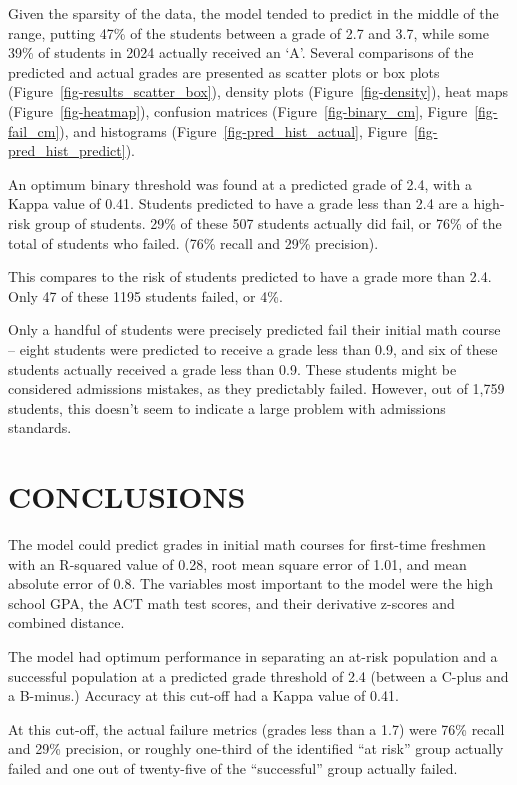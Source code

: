 \documentclass[
  letterpaper,
  DIV=11,
  numbers=noendperiod]{scrartcl}
\begin{document}
Given the sparsity of the data, the model tended to predict in the
middle of the range, putting 47\% of the students between a grade of 2.7
and 3.7, while some 39\% of students in 2024 actually received an `A'.
Several comparisons of the predicted and actual grades are presented as
scatter plots or box plots (Figure~\ref{fig-results_scatter_box}),
density plots (Figure~\ref{fig-density}), heat maps
(Figure~\ref{fig-heatmap}), confusion matrices
(Figure~\ref{fig-binary_cm}, Figure~\ref{fig-fail_cm}), and histograms
(Figure~\ref{fig-pred_hist_actual}, Figure~\ref{fig-pred_hist_predict}).

An optimum binary threshold was found at a predicted grade of 2.4, with
a Kappa value of 0.41. Students predicted to have a grade less than 2.4
are a high-risk group of students. 29\% of these 507 students actually
did fail, or 76\% of the total of students who failed. (76\% recall and
29\% precision).

This compares to the risk of students predicted to have a grade more
than 2.4. Only 47 of these 1195 students failed, or 4\%.

Only a handful of students were precisely predicted fail their initial
math course -- eight students were predicted to receive a grade less
than 0.9, and six of these students actually received a grade less than
0.9. These students might be considered admissions mistakes, as they
predictably failed. However, out of 1,759 students, this doesn't seem to
indicate a large problem with admissions standards.

\section{CONCLUSIONS}\label{conclusions}

The model could predict grades in initial math courses for first-time
freshmen with an R-squared value of 0.28, root mean square error of
1.01, and mean absolute error of 0.8. The variables most important to
the model were the high school GPA, the ACT math test scores, and their
derivative z-scores and combined distance.

The model had optimum performance in separating an at-risk population
and a successful population at a predicted grade threshold of 2.4
(between a C-plus and a B-minus.) Accuracy at this cut-off had a Kappa
value of 0.41.

At this cut-off, the actual failure metrics (grades less than a 1.7)
were 76\% recall and 29\% precision, or roughly one-third of the
identified ``at risk'' group actually failed and one out of twenty-five
of the ``successful'' group actually failed.
\end{document}
